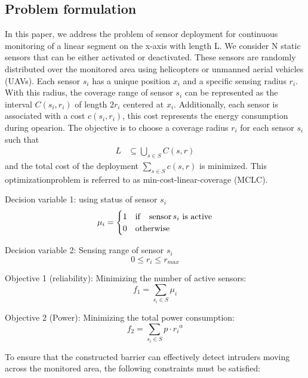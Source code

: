 \documentclass[preprint,12pt]{elsarticle}
\begin{document}
\subsection{Problem formulation}
In this paper, we address the problem of sensor deployment for continuous monitoring of a linear segment on the x-axis with length L. We consider N static sensors that can be either activated or deactivated. These sensors are randomly distributed over the monitored area using helicopters or unmanned aerial vehicles (UAVs). Each sensor $s_i$ has a unique position $x_i$ and a specific sensing radius $r_i$. With this radius, the coverage range of sensor $s_i$ can be represented as the interval $C(s_i, r_i)$ of length $2r_i$ centered at $x_i$. Additionally, each sensor is associated with a cost $c(s_i, r_i)$, this cost represents the energy consumption during opearion. The objective is to choose a coverage radius $r_i$ for each sensor $s_i$ such that
\begin{align*}
    L & \subseteq \bigcup_{s \in S} C(s, r)
\end{align*}
and the total cost of the deployment $\sum_{s\in S}c(s, r)$ is minimized. This optimizationproblem is referred to as min-cost-linear-coverage (MCLC).

Decision variable 1: using status of sensor $s_i$
\begin{equation}
    {\mu_i} =
    \begin{cases}
        1 & {\rm{if } } \quad \text{sensor} \, s_i \text{ is active} \\
        0 & {\rm{otherwise}}
    \end{cases}
\end{equation}

Decision variable 2: Sensing range of sensor $s_i$
\begin{equation}
    0 \leq {r_i} \leq {r_{max}}
\end{equation}


Objective 1 (reliability): Minimizing the number of active sensors:
\begin{equation}
    f_1 = \sum_{s_i \in S} \mu_i
\end{equation}

Objective 2 (Power): Minimizing the total power consumption:
\begin{equation}
    f_2 = \sum_{s_i \in S} p \cdot {r_i}^\alpha
\end{equation}


To ensure that the constructed barrier can effectively detect intruders moving across the monitored area, the following constraints must be satisfied:
\end{document}

